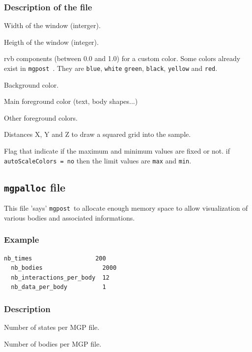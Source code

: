 \documentclass{simpledoc}
\newcommand{\mgpost}{\texttt{mgpost}\ }
\newcommand{\screen}[1]{\texttt{#1}}
\begin{document}
\subsubsection{Description of the file}

Width of the window (interger).

Heigth of the window (integer).

rvb components (between 0.0 and 1.0) for a custom color.
Some colors already exist in \mgpost. They are \screen{blue}, \screen{white} 
\screen{green}, \screen{black}, \screen{yellow} and \screen{red}.
 
Background color.

Main foreground color (text, body shapes...)

Other foreground colors.

Distances X, Y and Z to draw a squared grid into the sample.

Flag that indicate if the maximum and minimum values are fixed or not.
if \texttt{autoScaleColors = no} then the limit values are \screen{max} and \screen{min}.


\subsection{\screen{mgpalloc} file}

This file 'says' \mgpost to allocate enough memory space to allow visualization of various bodies and associated informations.

\subsubsection{Example}

\begin{lstlisting}[style=mgpdata]
  nb_times                  200
  nb_bodies                 2000
  nb_interactions_per_body  12
  nb_data_per_body          1
\end{lstlisting}

\subsubsection{Description}

Number of states per MGP file. 

Number of bodies per MGP file.
\end{document}
